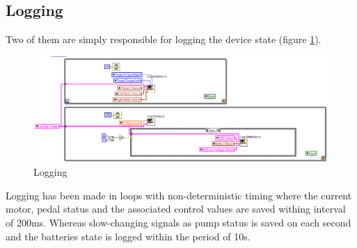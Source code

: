 \subsection{Logging}
Two of them are simply responsible for logging the device state (figure \ref{logging}).
\begin{figure}[H]
    \centering
    \includegraphics[scale=\visc,max width=\textwidth]{figures/Drive_log.png}
    \caption{Logging}
    \label{logging}
\end{figure}
Logging has been made in loops with non-deterministic timing where the current motor, pedal status and the associated control values are saved withing interval of 200ms.
Whereas slow-changing signals as pump status is saved on each second and the batteries state is logged within the period of 10s.

